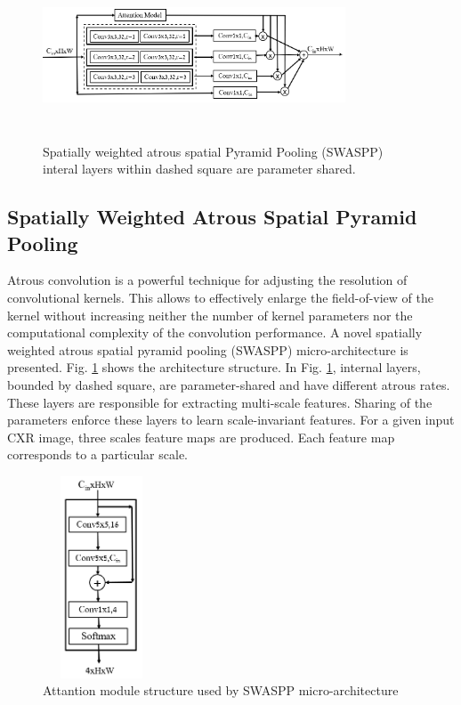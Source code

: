 \begin{center}
\begin{figure}[htbp]
\centerline{\includegraphics[height=50mm,width=9cm]{Figures/SWASPP.PNG}}
\caption{Spatially weighted atrous spatial Pyramid Pooling (SWASPP) interal layers within dashed square are parameter shared.}
\label{swaspp}
\end{figure}
\end{center}

\subsection{Spatially Weighted Atrous Spatial Pyramid Pooling}

Atrous convolution is a powerful technique for adjusting the resolution of  convolutional kernels. This allows to effectively enlarge the field-of-view of the kernel without increasing neither the number of kernel parameters  nor the computational complexity of  the convolution performance. A novel spatially weighted atrous spatial pyramid pooling (SWASPP) micro-architecture is presented. Fig. \ref{swaspp} shows the architecture structure. In Fig. \ref{swaspp}, internal layers, bounded by dashed square, are parameter-shared and have different atrous rates. These layers are responsible for extracting multi-scale features. Sharing of the parameters enforce these layers to learn scale-invariant features. For a given input CXR image,  three scales feature maps are produced. Each feature map  corresponds to a particular scale. 

\begin{center}
    \begin{figure}[htbp]
    \centerline{\includegraphics[height=60mm,width=3.5cm]{Figures/AttentionModUl.PNG}}
    \caption{Attantion module structure used by SWASPP micro-architecture}
    \label{attain}
    \end{figure}
    \end{center}
    
